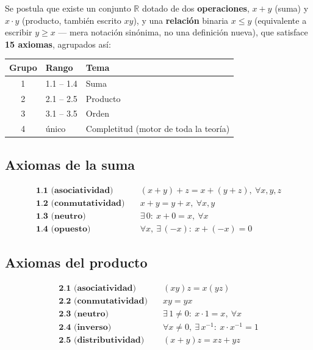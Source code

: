 \documentclass[12pt,a4paper]{article}
\begin{document}
Se postula que existe un conjunto $\mathbb{R}$ dotado de dos
\textbf{operaciones}, $x+y$ (suma) y $x\cdot y$ (producto, también escrito
$xy$), y una \textbf{relación} binaria $x\le y$ (equivalente a escribir
$y\ge x$ --- mera notación sinónima, no una definición nueva), que satisface
\textbf{15 axiomas}, agrupados así:

\begin{table}[H]
\centering
\begin{tabular}{@{}clp{7cm}@{}}
\toprule
Grupo & Rango & Tema \\
\midrule
1 & 1.1 -- 1.4 & Suma \\
2 & 2.1 -- 2.5 & Producto \\
3 & 3.1 -- 3.5 & Orden \\
4 & único & Completitud (motor de toda la teoría) \\
\bottomrule
\end{tabular}
\end{table}

\subsection{Axiomas de la suma}

\begin{align}
\textbf{1.1 (asociatividad)} &\quad (x+y)+z = x+(y+z), \ \forall x,y,z \\
\textbf{1.2 (conmutatividad)} &\quad x+y = y+x, \ \forall x,y \\
\textbf{1.3 (neutro)} &\quad \exists\, 0 : \ x + 0 = x, \ \forall x \\
\textbf{1.4 (opuesto)} &\quad \forall x, \ \exists\, (-x) : \ x + (-x) = 0
\end{align}

\subsection{Axiomas del producto}

\begin{align}
\textbf{2.1 (asociatividad)} &\quad (xy)z = x(yz) \\
\textbf{2.2 (conmutatividad)} &\quad xy = yx \\
\textbf{2.3 (neutro)} &\quad \exists\, 1 \ne 0 : \ x \cdot 1 = x, \ \forall x \\
\textbf{2.4 (inverso)} &\quad \forall x \ne 0, \ \exists\, x^{-1} : \ x\cdot x^{-1} = 1 \\
\textbf{2.5 (distributividad)} &\quad (x+y)z = xz + yz
\end{align}
\end{document}
